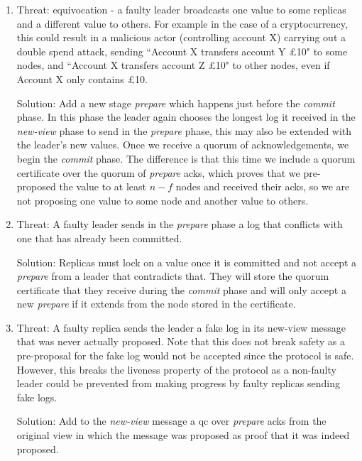 \begin{enumerate}
\item Threat: equivocation - a faulty leader broadcasts one value to some replicas and a different value to others. For example in the case of a cryptocurrency, this could result in a malicious actor (controlling account X) carrying out a double spend attack, sending ``Account X transfers account Y £10" to some nodes, and ``Account X transfers account Z £10" to other nodes, even if Account X only contains £10.

Solution: Add a new stage \textit{prepare} which happens just before the \textit{commit} phase. In this phase the leader again chooses the longest log it received in the \textit{new-view} phase to send in the \textit{prepare} phase, this may also be extended with the leader's new values. Once we receive a quorum of acknowledgements, we begin the \textit{commit} phase. The difference is that this time we include a quorum certificate over the quorum of \textit{prepare} acks, which proves that we pre-proposed the value to at least $n - f$ nodes and received their acks, so we are not proposing one value to some node and another value to others.

\item Threat: A faulty leader sends in the \textit{prepare} phase a log that conflicts with one that has already been committed.

Solution: Replicas must lock on a value once it is committed and not accept a \textit{prepare} from a leader that contradicts that. They will store the quorum certificate that they receive during the \textit{commit} phase and will only accept a new \textit{prepare} if it extends from the node stored in the certificate.

\item Threat: A faulty replica sends the leader a fake log in its new-view message that was never actually proposed. Note that this does not break safety as a pre-proposal for the fake log would not be accepted since the protocol is safe. However, this breaks the liveness property of the protocol as a non-faulty leader could be prevented from making progress by faulty replicas sending fake logs.

Solution: Add to the \textit{new-view} message a qc over \textit{prepare} acks from the original view in which the message was proposed as proof that it was indeed proposed.
\end{enumerate}

